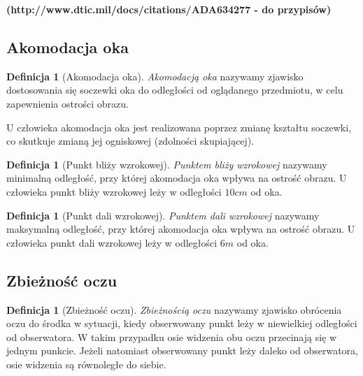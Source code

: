 \documentclass[a4paper,11pt,twoside]{report}
\theoremstyle{definition}
\newtheorem{definition}[theorem]{Definicja}
\begin{document}
\textbf{(http://www.dtic.mil/docs/citations/ADA634277 - do przypisów)}

\subsection{Akomodacja oka}

\begin{definition}[Akomodacja oka]
\textit{Akomodacją oka} nazywamy zjawisko dostosowania się soczewki oka do odległości od oglądanego przedmiotu, w celu zapewnienia ostrości obrazu.
\end{definition}

U człowieka akomodacja oka jest realizowana poprzez zmianę kształtu soczewki, co skutkuje zmianą jej ogniskowej (zdolności skupiającej).

\begin{definition}[Punkt bliży wzrokowej]
\textit{Punktem bliży wzrokowej} nazywamy minimalną odległość, przy której akomodacja oka wpływa na ostrość obrazu. U człowieka punkt bliży wzrokowej leży w odległości $10 cm$ od oka.
\end{definition}

\begin{minipage}{\linewidth}
\begin{definition}[Punkt dali wzrokowej]
\textit{Punktem dali wzrokowej} nazywamy maksymalną odległość, przy której akomodacja oka wpływa na ostrość obrazu. U człowieka punkt dali wzrokowej leży w odległości $6 m$ od oka.
\end{definition}
\end{minipage}

\subsection{Zbieżność oczu}

\begin{definition}[Zbieżność oczu]
\textit{Zbieżnością oczu} nazywamy zjawisko obrócenia oczu do środka w sytuacji, kiedy obserwowany punkt leży w niewielkiej odległości od obserwatora. W takim przypadku osie widzenia obu oczu przecinają się w jednym punkcie. Jeżeli natomiast obserwowany punkt leży daleko od obserwatora, osie widzenia są równoległe do siebie.
\end{definition}
\end{document}
